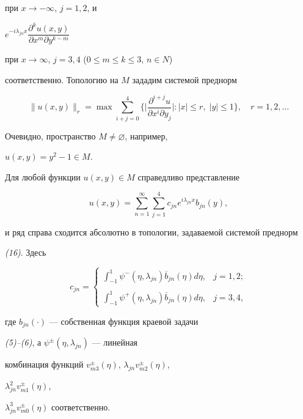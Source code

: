 при $x\to-\infty$, $j=1,2$, и 


$e^{-i\lambda_{jn}x}\dfrac{\partial^ku(x,y)}{\partial x^m\partial y^{k-m}}$


при $x\to\infty$, $j=3,4$ ($0\le m\le k\le 3$, $n\in N$)


соответственно. Топологию на $M$ зададим системой преднорм 


\begin{equation} 


\|u(x,y)\|_r =\max\sum^4_{i+j=0}\biggl\{ 


\biggl|\frac{\partial^{i+j}u}{\partial x^i\partial y_j}\biggr| : 


|x|\le r,\;|y|\le 1\biggr\},\quad r=1,2,\dotsc 


\end{equation} 


Очевидно, пространство $M\ne\varnothing$, например, 


$u(x,y)=y^2-1\in M$. 


 


\begin{thm} Для любой функции $u(x,y)\in M$ справедливо представление 


$$ 


u(x,y)=\sum^\infty_{n=1}\sum^4_{j=1}c_{jn}e^{i\lambda_{jn}x} 


b_{jn}(y), 


$$ 


и ряд справа сходится абсолютно в топологии, задаваемой системой преднорм 


{\em (16)}. Здесь 


$$ 


c_{jn}= 


\begin{cases} 


\int^1_{-1}\psi^-(\eta,\lambda_{jn})\overline b_{jn}(\eta)d\eta, 


& j=1,2; \\ 


& \\


\int^1_{-1}\psi^+(\eta,\lambda_{jn})\overline b_{jn}(\eta)d\eta, 


& j=3,4,


\end{cases} 


$$ 


где $b_{jn}(\cdot)$ --- собственная функция краевой задачи 


{\em (5)--(6)}, а $\psi^\pm(\eta,\lambda_{jn})$ --- линейная 


комбинация функций $v^\pm_{m3}(\eta)$, $\lambda_{jn}v^\pm_{m2}(\eta)$, 


$\lambda^2_{jn}v^\pm_{m1}(\eta)$, 


$\lambda^3_{jn}v^\pm_{m0}(\eta)$ соответственно. 


\end{thm} 


